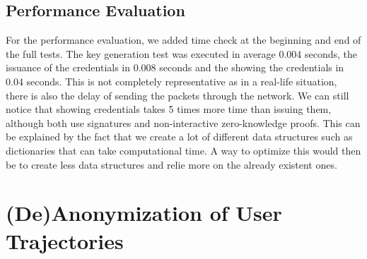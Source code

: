 \documentclass[10pt,conference,compsocconf]{IEEEtran}
\begin{document}
\subsection{Performance Evaluation}
For the performance evaluation, we added time check at the beginning and end of the full tests.
The key generation test was executed in average 0.004 seconds, the issuance of the credentials in 0.008 seconds and the showing the credentials in 0.04 seconds. This is not completely representative as in a real-life situation, there is also the delay of sending the packets through the network. We can still notice that showing credentials takes 5 times more time than issuing them, although both use signatures and non-interactive zero-knowledge proofs. This can be explained by the fact that we create a lot of different data structures such as dictionaries that can take computational time. A way to optimize this would then be to create less data structures and relie more on the already existent ones.

\section{(De)Anonymization of User Trajectories}
\end{document}
